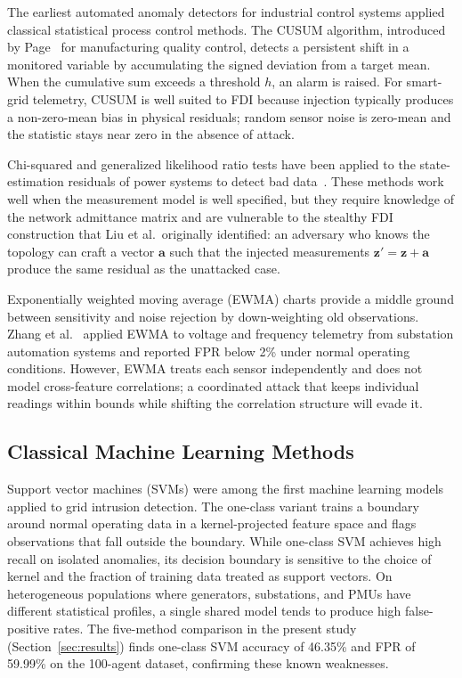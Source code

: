 The earliest automated anomaly detectors for industrial control systems applied classical
statistical process control methods. The CUSUM algorithm, introduced by Page~\cite{page1954} for
manufacturing quality control, detects a persistent shift in a monitored variable by accumulating
the signed deviation from a target mean. When the cumulative sum exceeds a threshold $h$, an alarm
is raised. For smart-grid telemetry, CUSUM is well suited to FDI because injection typically
produces a non-zero-mean bias in physical residuals; random sensor noise is zero-mean and the
statistic stays near zero in the absence of attack.

Chi-squared and generalized likelihood ratio tests have been applied to the state-estimation
residuals of power systems to detect bad data~\cite{liu2011false}. These methods work well when
the measurement model is well specified, but they require knowledge of the network admittance matrix
and are vulnerable to the stealthy FDI construction that Liu et al.\ originally identified: an
adversary who knows the topology can craft a vector $\mathbf{a}$ such that the injected measurements
$\mathbf{z}' = \mathbf{z} + \mathbf{a}$ produce the same residual as the unattacked case.

Exponentially weighted moving average (EWMA) charts provide a middle ground between sensitivity and
noise rejection by down-weighting old observations. Zhang et al.~\cite{zhang2019} applied EWMA
to voltage and frequency telemetry from substation automation systems and reported FPR below 2\%
under normal operating conditions. However, EWMA treats each sensor independently and does not
model cross-feature correlations; a coordinated attack that keeps individual readings within bounds
while shifting the correlation structure will evade it.

\subsection{Classical Machine Learning Methods}

Support vector machines (SVMs) were among the first machine learning models applied to grid
intrusion detection. The one-class variant trains a boundary around normal operating data in a
kernel-projected feature space and flags observations that fall outside the boundary. While
one-class SVM achieves high recall on isolated anomalies, its decision boundary is sensitive to the
choice of kernel and the fraction of training data treated as support vectors. On heterogeneous
populations where generators, substations, and PMUs have different statistical profiles, a single
shared model tends to produce high false-positive rates. The five-method comparison in the present
study (Section~\ref{sec:results}) finds one-class SVM accuracy of 46.35\% and FPR of 59.99\% on
the 100-agent dataset, confirming these known weaknesses.

